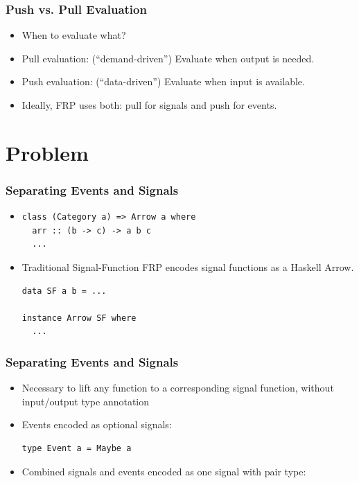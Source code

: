 \documentclass{beamer}
\begin{document}
\begin{frame}
\frametitle{Push vs. Pull Evaluation}
    \begin{itemize}
        \item When to evaluate what?
        \item Pull evaluation: (``demand-driven'') Evaluate when output is needed.
        \item Push evaluation: (``data-driven'') Evaluate when input is available.
        \item Ideally, FRP uses both: pull for signals and push for events.
    \end{itemize}
\end{frame}

\section{Problem}

\begin{frame}[fragile]
\frametitle{Separating Events and Signals}
    \begin{itemize}
        \item[] 
\begin{Verbatim}
class (Category a) => Arrow a where
  arr :: (b -> c) -> a b c
  ...
\end{Verbatim}
        \item Traditional Signal-Function FRP encodes signal functions as a Haskell Arrow.
\begin{Verbatim}
data SF a b = ...

instance Arrow SF where
  ...
\end{Verbatim}
    \end{itemize}
\end{frame}

\begin{frame}[fragile]
\frametitle{Separating Events and Signals}
    \begin{itemize}
        \item Necessary to lift any function to a corresponding signal function, without input/output type annotation
        \item Events encoded as optional signals:
\begin{Verbatim}
type Event a = Maybe a
\end{Verbatim}
        \item Combined signals and events encoded as one signal with pair type:
    \end{itemize}
\end{frame}
\end{document}
